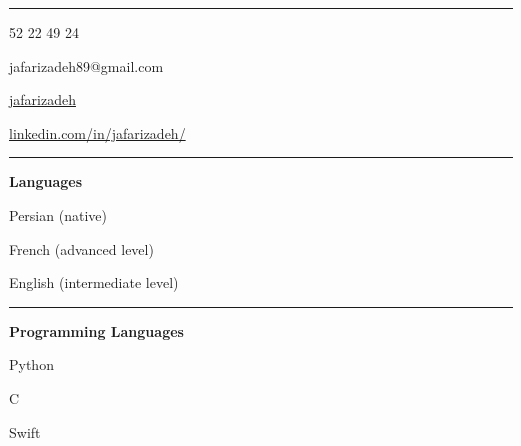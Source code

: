 \documentclass[a4paper]{letter}
\newcommand{\divider}{\rule{\linewidth}{0.9pt}}
\begin{document}
\begin{minipage}[t]{0.40\textwidth}
\setlength{\baselineskip}{1\baselineskip}
\color{white}
\vspace{4mm}



\vspace{5mm}

\divider


\faPhone {} 52 22 49 24

\faEnvelope \quad jafarizadeh89@gmail.com

\faGithub \quad \href{https://github.com/jafarizadeh}{jafarizadeh}

\faLinkedin \quad \href{https://www.linkedin.com/in/jafarizadeh/}{linkedin.com/in/jafarizadeh/}

\divider

{\large \textbf{Languages}}

\faCircleNotch \quad Persian (native)

\faCircleNotch \quad French (advanced level)

\faCircleNotch \quad English (intermediate level)

\divider


{\large \textbf{Programming Languages}}

\faCircleNotch \quad Python

\faCircleNotch \quad C

\faCircleNotch \quad Swift


\end{minipage}
\end{document}
